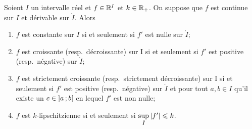 \begin{theo}
  Soient \(I\) un intervalle réel et \(f \in \mathbb{R}^I\) et \(k \in \mathbb{R}_{+}\). On
  suppose que \(f\) est continue sur \(I\) et dérivable sur \(\mathring{I}\).
  Alors
  \begin{enumerate}
    \item \(f\) est constante sur \(I\) si et seulement si \(f'\) est nulle sur
      \(\mathring{I}\);
    \item \(f\) est croissante (resp.\ décroissante) sur I si et seulement si
      \(f'\) est positive (resp.\ négative) sur \(\mathring{I}\);
    \item \(f\) est strictement croissante (resp.\ strictement décroissante) sur
      I si et seulement si \(f'\) est positive (resp.\ négative) sur
      \(\mathring{I}\) et pour tout \(a,b \in I\) qu'il existe un \(c \in
      \left] a \, ; {} b \right[\) en lequel \(f'\) est non nulle;
    \item \(f\) est \(k\)-lipschitzienne si et seulement si
      \(\sup\limits_{\mathring{I}} \left\lvert f'\right\rvert \leqslant k\).
  \end{enumerate}
\end{theo}
